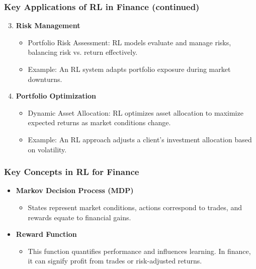 \documentclass[aspectratio=169]{beamer}
\begin{document}
\begin{frame}
    \frametitle{Key Applications of RL in Finance (continued)}
    \begin{enumerate}
        \setcounter{enumi}{2}
        \item \textbf{Risk Management}
            \begin{itemize}
                \item Portfolio Risk Assessment: RL models evaluate and manage risks, balancing risk vs. return effectively.
                \item Example: An RL system adapts portfolio exposure during market downturns.
            \end{itemize}

        \item \textbf{Portfolio Optimization}
            \begin{itemize}
                \item Dynamic Asset Allocation: RL optimizes asset allocation to maximize expected returns as market conditions change.
                \item Example: An RL approach adjusts a client's investment allocation based on volatility.
            \end{itemize}
    \end{enumerate}
\end{frame}

\begin{frame}[fragile]
    \frametitle{Key Concepts in RL for Finance}
    \begin{itemize}
        \item \textbf{Markov Decision Process (MDP)}
            \begin{itemize}
                \item States represent market conditions, actions correspond to trades, and rewards equate to financial gains.
            \end{itemize}
        
        \item \textbf{Reward Function}
            \begin{itemize}
                \item This function quantifies performance and influences learning. In finance, it can signify profit from trades or risk-adjusted returns.
            \end{itemize}
    \end{itemize}
\end{frame}
\end{document}
